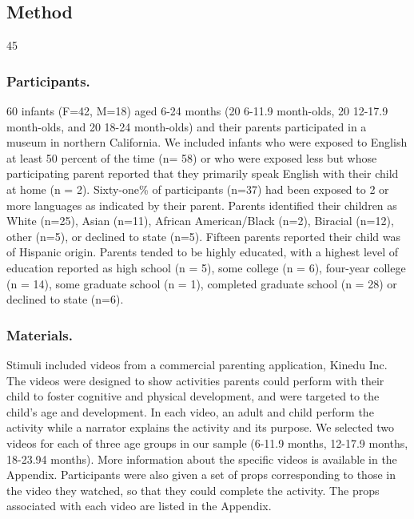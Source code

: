 \documentclass[10pt, letterpaper]{article}
\newenvironment{CodeChunk}{}{}
\begin{document}
\subsection{Method}\label{method}

\begin{CodeChunk}
\begin{CodeOutput}
[1] 45
\end{CodeOutput}
\end{CodeChunk}

\subsubsection{Participants.}\label{participants.}

60 infants (F=42, M=18) aged 6-24 months (20 6-11.9 month-olds, 20
12-17.9 month-olds, and 20 18-24 month-olds) and their parents
participated in a museum in northern California. We included infants who
were exposed to English at least 50 percent of the time (n= 58) or who
were exposed less but whose participating parent reported that they
primarily speak English with their child at home (n = 2). Sixty-one\% of
participants (n=37) had been exposed to 2 or more languages as indicated
by their parent. Parents identified their children as White (n=25),
Asian (n=11), African American/Black (n=2), Biracial (n=12), other
(n=5), or declined to state (n=5). Fifteen parents reported their child
was of Hispanic origin. Parents tended to be highly educated, with a
highest level of education reported as high school (n = 5), some college
(n = 6), four-year college (n = 14), some graduate school (n = 1),
completed graduate school (n = 28) or declined to state (n=6).

\subsubsection{Materials.}\label{materials.}

Stimuli included videos from a commercial parenting application, Kinedu
Inc. The videos were designed to show activities parents could perform
with their child to foster cognitive and physical development, and were
targeted to the child's age and development. In each video, an adult and
child perform the activity while a narrator explains the activity and
its purpose. We selected two videos for each of three age groups in our
sample (6-11.9 months, 12-17.9 months, 18-23.94 months). More
information about the specific videos is available in the Appendix.
Participants were also given a set of props corresponding to those in
the video they watched, so that they could complete the activity. The
props associated with each video are listed in the Appendix.
\end{document}
